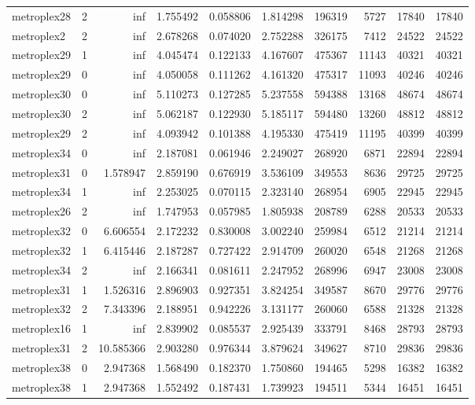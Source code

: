 \begin{longtable}{|l|r|r|r|r|r|r|r|r|r|}
metroplex28 & 2 & inf & 1.755492 & 0.058806 & 1.814298 & 196319 & 5727 & 17840 & 17840 \\
metroplex2 & 2 & inf & 2.678268 & 0.074020 & 2.752288 & 326175 & 7412 & 24522 & 24522 \\
metroplex29 & 1 & inf & 4.045474 & 0.122133 & 4.167607 & 475367 & 11143 & 40321 & 40321 \\
metroplex29 & 0 & inf & 4.050058 & 0.111262 & 4.161320 & 475317 & 11093 & 40246 & 40246 \\
metroplex30 & 0 & inf & 5.110273 & 0.127285 & 5.237558 & 594388 & 13168 & 48674 & 48674 \\
metroplex30 & 2 & inf & 5.062187 & 0.122930 & 5.185117 & 594480 & 13260 & 48812 & 48812 \\
metroplex29 & 2 & inf & 4.093942 & 0.101388 & 4.195330 & 475419 & 11195 & 40399 & 40399 \\
metroplex34 & 0 & inf & 2.187081 & 0.061946 & 2.249027 & 268920 & 6871 & 22894 & 22894 \\
metroplex31 & 0 & 1.578947 & 2.859190 & 0.676919 & 3.536109 & 349553 & 8636 & 29725 & 29725 \\
metroplex34 & 1 & inf & 2.253025 & 0.070115 & 2.323140 & 268954 & 6905 & 22945 & 22945 \\
metroplex26 & 2 & inf & 1.747953 & 0.057985 & 1.805938 & 208789 & 6288 & 20533 & 20533 \\
metroplex32 & 0 & 6.606554 & 2.172232 & 0.830008 & 3.002240 & 259984 & 6512 & 21214 & 21214 \\
metroplex32 & 1 & 6.415446 & 2.187287 & 0.727422 & 2.914709 & 260020 & 6548 & 21268 & 21268 \\
metroplex34 & 2 & inf & 2.166341 & 0.081611 & 2.247952 & 268996 & 6947 & 23008 & 23008 \\
metroplex31 & 1 & 1.526316 & 2.896903 & 0.927351 & 3.824254 & 349587 & 8670 & 29776 & 29776 \\
metroplex32 & 2 & 7.343396 & 2.188951 & 0.942226 & 3.131177 & 260060 & 6588 & 21328 & 21328 \\
metroplex16 & 1 & inf & 2.839902 & 0.085537 & 2.925439 & 333791 & 8468 & 28793 & 28793 \\
metroplex31 & 2 & 10.585366 & 2.903280 & 0.976344 & 3.879624 & 349627 & 8710 & 29836 & 29836 \\
metroplex38 & 0 & 2.947368 & 1.568490 & 0.182370 & 1.750860 & 194465 & 5298 & 16382 & 16382 \\
metroplex38 & 1 & 2.947368 & 1.552492 & 0.187431 & 1.739923 & 194511 & 5344 & 16451 & 16451 \\

\end{longtable}
